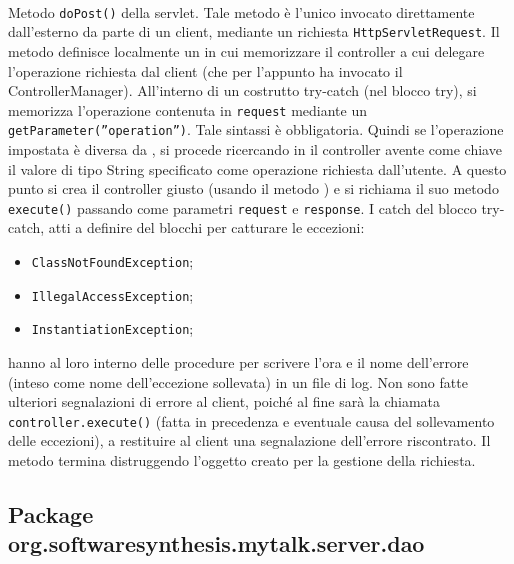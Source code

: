\begin{description}
	\item{}\\
	Metodo \texttt{doPost()} della servlet. Tale metodo è l'unico invocato direttamente dall'esterno da parte di un client, mediante un richiesta \texttt{HttpServletRequest}. Il metodo definisce localmente un  in cui memorizzare il controller a cui delegare l'operazione richiesta dal client (che per l'appunto ha invocato il ControllerManager). All'interno di un costrutto try-catch (nel blocco try), si memorizza l'operazione contenuta in \texttt{request} mediante un \texttt{getParameter(''operation'')}. Tale sintassi è obbligatoria. Quindi se l'operazione impostata è diversa da , si procede ricercando in  il controller avente come chiave il valore di tipo String specificato come operazione richiesta dall'utente. A questo punto si crea il controller giusto (usando il metodo ) e si richiama il suo metodo \texttt{execute()} passando come parametri \texttt{request} e \texttt{response}. I catch del blocco try-catch, atti a definire del blocchi per catturare le eccezioni: 
	\begin{itemize}
		\item \texttt{ClassNotFoundException};
		\item \texttt{IllegalAccessException};
		\item \texttt{InstantiationException};
	\end{itemize}
	
	hanno al loro interno delle procedure per scrivere l'ora e il nome dell'errore (inteso come nome dell'eccezione sollevata) in un file di log. Non sono fatte ulteriori segnalazioni di errore al client, poiché al fine sarà la chiamata \texttt{controller.execute()} (fatta in precedenza e eventuale causa del sollevamento delle eccezioni), a restituire al client una segnalazione dell'errore riscontrato. Il metodo termina distruggendo l'oggetto  creato per la gestione della richiesta.
	
\end{description}

\subsection{Package org.softwaresynthesis.mytalk.server.dao}\label{sec:dao}



